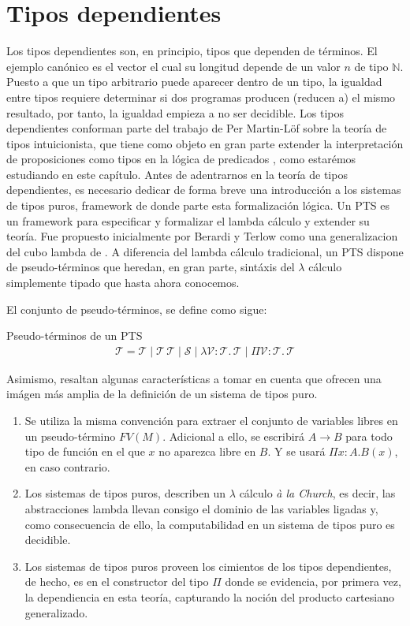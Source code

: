    \section{Tipos dependientes}
    Los tipos dependientes son, en principio, tipos que dependen de términos. El ejemplo canónico es el vector el cual su longitud depende de un valor $n$ de tipo $\mathbb{N}$. Puesto a que un tipo arbitrario puede aparecer dentro de un tipo, la igualdad entre tipos requiere determinar si dos programas producen (reducen a) el mismo resultado, por tanto, la igualdad empieza a no ser decidible. Los tipos dependientes conforman parte del trabajo de Per Martin-Löf sobre la teoría de tipos intuicionista, que tiene como objeto en gran parte extender la interpretación de proposiciones como tipos en la lógica de predicados \citep{martinlof75}, como estarémos estudiando en este capítulo. Antes de adentrarnos en la teoría de tipos dependientes, es necesario dedicar de forma breve una introducción a los sistemas de tipos puros, framework de donde parte esta formalización lógica. Un PTS es un framework para especificar y formalizar el lambda cálculo y extender su teoría. Fue propuesto inicialmente por Berardi y Terlow como una generalizacion del cubo lambda de \cite{cube1991}. A diferencia del lambda cálculo tradicional, un PTS dispone de pseudo-términos que heredan, en gran parte, sintáxis del $\lambda$ cálculo simplemente tipado que hasta ahora conocemos.
    

    El conjunto de pseudo-términos, se define como sigue:
    \begin{definition} Pseudo-términos de un PTS
    \begin{align*}
      \mathcal{T} = \mathcal{T} \mid \mathcal{T}\, \mathcal{T} \mid \mathcal{S} \mid \lambda \mathcal{V}: \mathcal{T}.\, \mathcal{T} \mid \Pi \mathcal{V}: \mathcal{T}.\, \mathcal{T}
    \end{align*}
    \end{definition}

    Asimismo, resaltan \cite{barthe-coquand} algunas características a tomar en cuenta que ofrecen una imágen más amplia de la definición de un sistema de tipos puro.

    \begin{enumerate}
            \item Se utiliza la misma convención para extraer el conjunto de variables libres en un pseudo-término $FV(M)$. Adicional a ello, se escribirá $A \to B$ para todo tipo de función en el que $x$ no aparezca libre en $B$. Y se usará $\Pi x: A . B(x)$, en caso contrario.
            \item Los sistemas de tipos puros, describen un $\lambda$ cálculo \textit{à la Church}, es decir, las abstracciones lambda llevan consigo el dominio  de las variables ligadas y, como consecuencia de ello, la computabilidad en un sistema de tipos puro es decidible.
            \item Los sistemas de tipos puros proveen los cimientos de los tipos dependientes, de hecho, es en el constructor del tipo $\Pi$ donde se evidencia, por primera vez, la dependiencia en esta teoría, capturando la noción del producto cartesiano generalizado.
    \end{enumerate}

